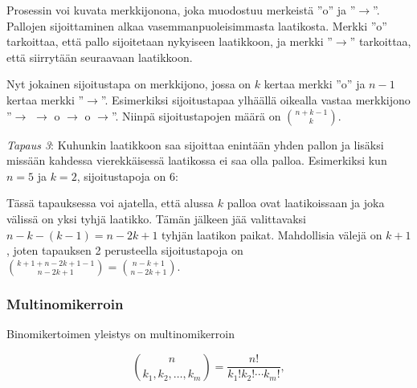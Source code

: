 Prosessin voi kuvata merkkijonona, joka muodostuu
merkeistä ''o'' ja ''$\rightarrow$''.
Pallojen sijoittaminen alkaa
vasemmanpuoleisimmasta laatikosta.
Merkki ''o'' tarkoittaa, että pallo sijoitetaan
nykyiseen laatikkoon, ja merkki
''$\rightarrow$'' tarkoittaa, että siirrytään
seuraavaan laatikkoon.

Nyt jokainen sijoitustapa on merkkijono, jossa
on $k$ kertaa merkki ''o'' ja $n-1$ kertaa
merkki ''$\rightarrow$''.
Esimerkiksi sijoitustapaa
ylhäällä oikealla
vastaa merkkijono ''$\rightarrow$ $\rightarrow$ o $\rightarrow$ o $\rightarrow$''.
Niinpä sijoitustapojen määrä on ${n+k-1 \choose k}$.

\textit{Tapaus 3}: Kuhunkin laatikkoon saa sijoittaa
enintään yhden pallon ja lisäksi missään kahdessa
vierekkäisessä laatikossa ei saa olla palloa.
Esimerkiksi kun $n=5$ ja $k=2$, sijoitustapoja on 6:


\begin{center}
\end{center}

Tässä tapauksessa voi ajatella, että alussa $k$ palloa
ovat laatikoissaan ja joka välissä on yksi tyhjä laatikko.
Tämän jälkeen jää valittavaksi $n-k-(k-1)=n-2k+1$ tyhjän laatikon paikat.
Mahdollisia välejä on $k+1$, joten tapauksen 2 perusteella
sijoitustapoja on ${k+1+n-2k+1-1 \choose n-2k+1} = {n-k+1 \choose n-2k+1}$.

\subsubsection{Multinomikerroin}

Binomikertoimen yleistys on multinomikerroin

\[ {n \choose k_1,k_2,\ldots,k_m} = \frac{n!}{k_1! k_2! \cdots k_m!}, \]

